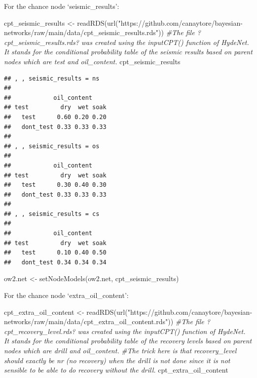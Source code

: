 \documentclass[
]{article}
\newenvironment{Shaded}{\begin{snugshade}}{\end{snugshade}}
\newcommand{\CommentTok}[1]{\textcolor[rgb]{0.56,0.35,0.01}{\textit{#1}}}
\newcommand{\FunctionTok}[1]{\textcolor[rgb]{0.00,0.00,0.00}{#1}}
\newcommand{\NormalTok}[1]{#1}
\newcommand{\OtherTok}[1]{\textcolor[rgb]{0.56,0.35,0.01}{#1}}
\newcommand{\StringTok}[1]{\textcolor[rgb]{0.31,0.60,0.02}{#1}}
\begin{document}
For the chance node `seismic\_results':

\begin{Shaded}
\begin{Highlighting}[]
\NormalTok{cpt\_seismic\_results }\OtherTok{\textless{}{-}} \FunctionTok{readRDS}\NormalTok{(}\FunctionTok{url}\NormalTok{(}\StringTok{"https://github.com/canaytore/bayesian{-}networks/raw/main/data/cpt\_seismic\_results.rds"}\NormalTok{))}
\CommentTok{\#The file ?cpt\_seismic\_results.rds? was created using the inputCPT() function of HydeNet. It stands for the conditional probability table of the seismic results based on parent nodes which are \textquotesingle{}test\textquotesingle{} and \textquotesingle{}oil\_content\textquotesingle{}.}
\NormalTok{cpt\_seismic\_results}
\end{Highlighting}
\end{Shaded}

\begin{verbatim}
## , , seismic_results = ns
## 
##            oil_content
## test         dry  wet soak
##   test      0.60 0.20 0.20
##   dont_test 0.33 0.33 0.33
## 
## , , seismic_results = os
## 
##            oil_content
## test         dry  wet soak
##   test      0.30 0.40 0.30
##   dont_test 0.33 0.33 0.33
## 
## , , seismic_results = cs
## 
##            oil_content
## test         dry  wet soak
##   test      0.10 0.40 0.50
##   dont_test 0.34 0.34 0.34
\end{verbatim}

\begin{Shaded}
\begin{Highlighting}[]
\NormalTok{ow2.net }\OtherTok{\textless{}{-}} \FunctionTok{setNodeModels}\NormalTok{(ow2.net, cpt\_seismic\_results)}
\end{Highlighting}
\end{Shaded}

For the chance node `extra\_oil\_content':

\begin{Shaded}
\begin{Highlighting}[]
\NormalTok{cpt\_extra\_oil\_content }\OtherTok{\textless{}{-}} \FunctionTok{readRDS}\NormalTok{(}\FunctionTok{url}\NormalTok{(}\StringTok{"https://github.com/canaytore/bayesian{-}networks/raw/main/data/cpt\_extra\_oil\_content.rds"}\NormalTok{))}
\CommentTok{\#The file ?cpt\_recovery\_level.rds? was created using the inputCPT() function of HydeNet. It stands for the conditional probability table of the recovery levels based on parent nodes which are \textquotesingle{}drill\textquotesingle{} and \textquotesingle{}oil\_content\textquotesingle{}.}
\CommentTok{\#The trick here is that \textquotesingle{}recovery\_level\textquotesingle{} should exactly be nr (no recovery) when the drill is not done since it is not sensible to be able to do \textquotesingle{}recovery\textquotesingle{} without the \textquotesingle{}drill\textquotesingle{}.}
\NormalTok{cpt\_extra\_oil\_content}
\end{Highlighting}
\end{Shaded}
\end{document}
